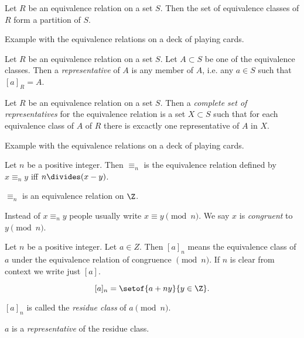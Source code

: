 \documentclass[oneside,12pt]{amsart}
\begin{document}
\begin{lemma}
Let $R$ be an equivalence relation on a set $S$. Then the set of equivalence classes of $R$ form a partition of $S$.
\end{lemma}

\begin{in_class_example}
Example with the equivalence relations on a deck of playing cards.
\end{in_class_example}

\begin{definition}
Let $R$ be an equivalence relation on a set $S$. Let $A\subset S$ be one of the equivalence classes. Then a \emph{representative} of $A$ is any member of $A$,
i.e. any $a\in S$ such that $[a]_R=A$.
\end{definition}

\begin{definition}
Let $R$ be an equivalence relation on a set $S$. Then a \emph{complete set of representatives} for the equivalence relation is
a set $X\subset S$ such that for each equivalence class of $A$ of $R$ there is excactly one representative of $A$ in $X$.
\end{definition}

\begin{in_class_example}
Example with the equivalence relations on a deck of playing cards.
\end{in_class_example}

\begin{definition}
Let $n$ be a positive integer. Then $\equiv_n$ is the equivalence relation defined by $x\equiv_n y$ iff $n\divides (x-y)$.
\end{definition}

$\equiv_n$ is an equivalence relation on $\Z$.

\bigskip

Instead of $x\equiv_n y$ people usually write $x\equiv y \pmod{n}$.
We say $x$ is \emph{congruent} to $y \pmod{n}$.

\bigskip

Let $n$ be a positive integer.  Let $a\in Z$. Then $[a]_n$ means the equivalence
class of $a$ under the equivalence relation of congruence $\pmod n$. If $n$ is
clear from context we write just $[a]$. 

$$[a]_n = \setof{a + ny}{y\in\Z}.$$

$[a]_n$ is called the \emph{residue class} of $a \pmod n$.

$a$ is a \emph{representative} of the residue class.
\end{document}
